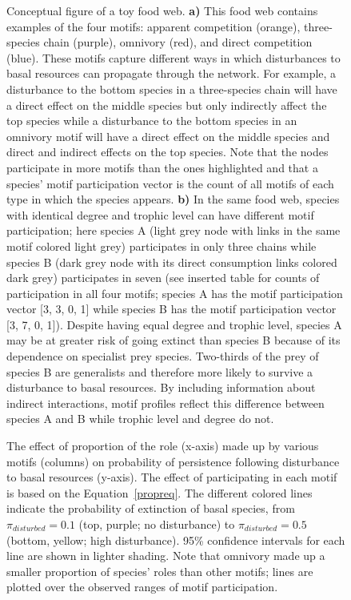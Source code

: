 \documentclass[12pt]{article}
\begin{document}
\begin{spacing}{1.0}
        \begin{figure}[hb!]
        \centering
        \caption{Conceptual figure of a toy food web. \textbf{a)} This food web contains examples of the four motifs: apparent competition (orange), three-species chain (purple), omnivory (red), and direct competition (blue). These motifs capture different ways in which disturbances to basal resources can propagate through the network. For example, a disturbance to the bottom species in a three-species chain will have a direct effect on the middle species but only indirectly affect the top species while a disturbance to the bottom species in an omnivory motif will have a direct effect on the middle species and direct and indirect effects on the top species. 
        Note that the nodes participate in more motifs than the ones highlighted and that a species' motif participation vector is the count of all motifs of each type in which the species appears. \textbf{b)} In the same food web, species with identical degree and trophic level can have different motif participation; here species A (light grey node with links in the same motif colored light grey) participates in only three chains while species B (dark grey node with its direct consumption links colored dark grey) participates in seven (see inserted table for counts of participation in all four motifs; species A has the motif participation vector [3, 3, 0, 1] while species B has the motif participation vector [3, 7, 0, 1]).
        Despite having equal degree and trophic level, species A may be at greater risk of going extinct than species B because of its dependence on specialist prey species. Two-thirds of the prey of species B are generalists and therefore more likely to survive a disturbance to basal resources. By including information about indirect interactions, motif profiles reflect this difference between species A and B while trophic level and degree do not.}
    \label{fig:concept}
    \end{figure}


        \begin{figure}[hb!]
        \centering
        \caption{The effect of proportion of the role (x-axis) made up by various motifs (columns) on probability of persistence following disturbance to basal resources (y-axis). The effect of participating in each motif is based on the Equation~\ref{propreq}. The different colored lines indicate the probability of extinction of basal species, from $\pi_{disturbed} = 0.1$ (top, purple; no disturbance) to $\pi_{disturbed} = 0.5$ (bottom, yellow; high disturbance). 95\% confidence intervals for each line are shown in lighter shading. Note that omnivory made up a smaller proportion of species' roles than other motifs; lines are plotted over the observed ranges of motif participation.}
    \label{fig:prop_lmer_all}
    \end{figure}
        

\end{spacing}
\end{document}
